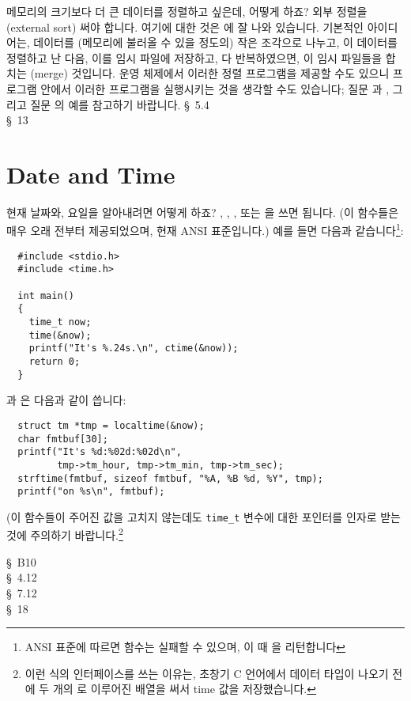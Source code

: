 \begin{faq}
	메모리의 크기보다 더 큰 데이터를 정렬하고 싶은데, 어떻게 하죠?
\A
	외부 정렬을 (external sort) 써야 합니다.  여기에 대한 것은
	\cite{knuth}에 잘 나와 있습니다.  기본적인 아이디어는, 데이터를
	(메모리에 불러올 수 있을 정도의) 작은 조각으로 나누고,
	이 데이터를 정렬하고 난 다음, 이를 임시 파일에 저장하고,
	다 반복하였으면, 이 임시 파일들을 합치는 (merge) 것입니다.
	운영 체제에서 이러한 정렬 프로그램을 제공할 수도 있으니
	프로그램 안에서 이러한 프로그램을 실행시키는 것을
	생각할 수도 있습니다; 질문 과 , 그리고
        질문 의 예를 참고하기 바랍니다.
\R
	\cite{knuth} \S\ 5.4  \\
	\cite{calgo} \S\ 13 
\end{faq}

\section{Date and Time}

\begin{faq}
	현재 날짜와, 요일을 알아내려면 어떻게 하죠?
\A
	, , , 또는 을
	쓰면 됩니다. (이 함수들은 매우 오래 전부터 제공되었으며, 현재 ANSI
        표준입니다.) 예를 들면 다음과 같습니다\footnote{ANSI 표준에 따르면
           함수는 실패할 수 있으며, 이 때 을
          리턴합니다}:
\begin{verbatim}
  #include <stdio.h>
  #include <time.h>

  int main()
  {
    time_t now;
    time(&now);
    printf("It's %.24s.\n", ctime(&now));
    return 0;
  }
\end{verbatim}

	과 은 다음과 같이 씁니다:
\begin{verbatim}
  struct tm *tmp = localtime(&now);
  char fmtbuf[30];
  printf("It's %d:%02d:%02d\n",
         tmp->tm_hour, tmp->tm_min, tmp->tm_sec);
  strftime(fmtbuf, sizeof fmtbuf, "%A, %B %d, %Y", tmp);
  printf("on %s\n", fmtbuf);
\end{verbatim}

	\noindent (이 함수들이 주어진 값을 고치지 않는데도 
        \verb+time_t+ 변수에 대한 포인터를
        인자로 받는 것에 주의하기 바랍니다.\footnote{이런 식의 인터페이스를
          쓰는 이유는, 초창기 C 언어에서  데이터 타입이 나오기 전에
          두 개의 로 이루어진 배열을 써서 time 값을 저장했습니다.}

\R
	\cite{kr2} \S\ B10  \\
	\cite{ansi} \S\ 4.12 \\
	\cite{c89} \S\ 7.12 \\
	\cite{hs} \S\ 18
\end{faq}


